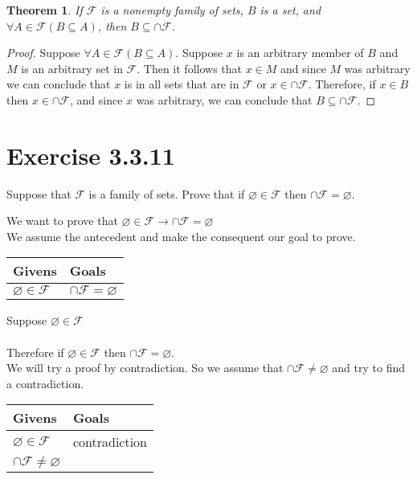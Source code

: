 \documentclass{article}
\newcommand{\n}{ \noindent }
\newcommand{\F}{\mathcal{F}}
\newtheorem*{theorem}{Theorem}  %
\begin{document}
\begin{theorem} If $\F$ is a nonempty family of sets, $B$ is a set, and $\forall A \in \F(B \subseteq A)$, then $B \subseteq \cap \F$.
\end{theorem}
\begin{proof}
Suppose $\forall A \in \F(B \subseteq A)$. Suppose $x$ is an arbitrary member of $B$ and $M$ is an arbitrary set in $\F$. Then it follows that $x \in M$ and since $M$ was arbitrary we can conclude that $x$ is in all sets that are in $\F$ or $x \in \cap \F$. Therefore, if $x \in B$ then $x \in \cap \F$, and since $x$ was arbitrary, we can conclude that $B \subseteq \cap \F$. 
\end{proof}


\section*{Exercise 3.3.11}

Suppose that $\F$ is a family of sets. Prove that if $\varnothing \in \F$ then $\cap \F = \varnothing$.

\n We want to prove that
$\varnothing \in \F \rightarrow \cap \F = \varnothing$ \\

\n We assume the antecedent and make the consequent our goal to prove. \\

\begin{table}[h]
\begin{tabular}{ll}
\hline
Givens & Goals   \\ \hline
$\varnothing \in \F$  & $\cap \F = \varnothing$   \\ \hline
\end{tabular}
\end{table}

\n Suppose $\varnothing \in \F$ \\
\indent [proof of $\cap \F = \varnothing$] \\
\n Therefore if $\varnothing \in \F$ then $\cap \F = \varnothing$. \\

\n We will try a proof by contradiction. So we assume that $\cap \F \neq \varnothing$ and try to find a contradiction.

\begin{table}[h]
\begin{tabular}{ll}
\hline
Givens & Goals   \\ \hline
$\varnothing \in \F$  &  contradiction \\
$\cap \F \neq \varnothing$  & \\ \hline
\end{tabular}
\end{table}
\end{document}
